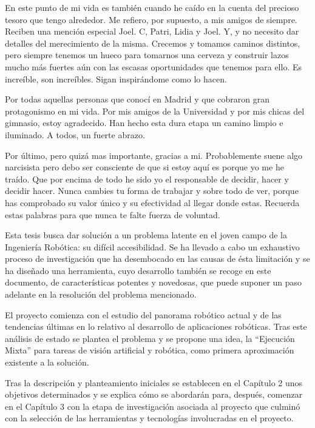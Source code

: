 \documentclass[11pt,a4paper,twoside]{book}
\begin{document}
En este punto de mi vida es también cuando he caído en la cuenta del precioso tesoro que tengo alrededor. Me refiero, por supuesto, a mis amigos de siempre. Reciben una mención especial Joel. C, Patri, Lidia y Joel. Y, y no necesito dar detalles del merecimiento de la misma. Crecemos y tomamos caminos distintos, pero siempre tenemos un hueco para tomarnos una cerveza y construir lazos mucho más fuertes aún con las escasas oportunidades que tenemos para ello. Es increíble, son increíbles. Sigan inspirándome como lo hacen.

Por todas aquellas personas que conocí en Madrid y que cobraron gran protagonismo en mi vida. Por mis amigos de la Universidad y por mis chicas del gimnasio, estoy agradecido. Han hecho esta dura etapa un camino limpio e iluminado. A todos, un fuerte abrazo.

Por último, pero quizá mas importante, gracias a mi. Probablemente suene algo narcisista pero debo ser consciente de que si estoy aquí es porque yo me he traído. Que por encima de todo he sido yo el responsable de decidir, hacer y decidir hacer. Nunca cambies tu forma de trabajar y sobre todo de ver, porque has comprobado su valor único y su efectividad al llegar donde estas. Recuerda estas palabras para que nunca te falte fuerza de voluntad.

Esta tesis busca dar solución a un problema latente en el joven campo de la Ingeniería Robótica: su difícil accesibilidad. Se ha llevado a cabo un exhaustivo proceso de investigación que ha desembocado en las causas de ésta limitación y se ha diseñado una herramienta, cuyo desarrollo también se recoge en este documento, de características potentes y novedosas, que puede suponer un paso adelante en la resolución del problema mencionado. 

El proyecto comienza con el estudio del panorama robótico actual y de las tendencias últimas en lo relativo al desarrollo de aplicaciones robóticas. Tras este análisis de estado se plantea el problema y se propone una idea, la ``Ejecución Mixta'' para tareas de visión artificial y robótica, como primera aproximación existente a la solución.

Tras la descripción y planteamiento iniciales se establecen en el Capítulo 2 unos objetivos determinados y se explica cómo se abordarán para, después, comenzar en el Capítulo 3 con la etapa de investigación asociada al proyecto que culminó con la selección de las herramientas y tecnologías involucradas en el proyecto.
\end{document}
